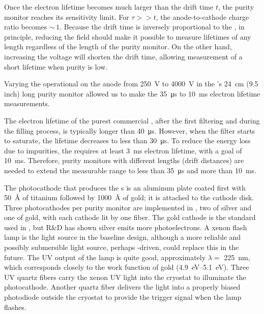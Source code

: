 Once the electron lifetime becomes much larger than the drift time $t$, the purity monitor reaches its sensitivity limit.  For $\tau >> t$, the anode-to-cathode charge ratio becomes $\sim\,1$. Because the drift time is inversely proportional to the \efield, in principle, reducing the %
field should make it possible to measure lifetimes of any length regardless of the length of the purity monitor.
On the other hand, increasing the voltage will shorten the drift time, allowing measurement of a short lifetime when purity is low. 


Varying the operational  on the anode from \SI{250}{V} to \SI{4000}{V} in the 's \SI{24}{cm} (9.5 inch) long purity monitor allowed us to make the \SI{35}{\micro\second} to \SI{10}{\milli\second} electron lifetime measurements. 

The electron lifetime of the purest commercial \lar, after the first filtering and during the filling process, is typically longer than \SI{40}{\micro\second}. However, when the filter starts to saturate, the lifetime decreases to less than \SI{30}{\micro\second}.  To %
reduce the energy loss due to impurities,  the  requires 
at least \SI{3}{\milli\second} electron lifetime, with a goal of \SI{10}{\milli\second}. 
Therefore, purity monitors with different lengths (drift distances) are needed to extend the measurable range to less than \SI{35}{\micro\second} and more than  \SI{10}{\milli\second}.


The photocathode that produces the \phel{}s is an aluminum plate coated first with \SI{50}{\angstrom} of titanium followed by \SI{1000}{\angstrom} of gold; it is attached to the cathode disk.
Three photocathodes per purity monitor are implemented in , two of silver and one of gold, with each cathode lit by one fiber. The gold cathode is the standard used in , but R\&D has shown silver emits more photoelectrons.
A xenon flash lamp is the light source in the baseline design, although %
a more reliable and possibly submersible light source, perhaps -driven, could replace this in the future. The UV output of the lamp is quite good, approximately $\lambda=$ \SI{225}{\nano\meter}, which corresponds closely to the work function of gold (\SIrange{4.9}{5.1}{\eV}). 
Three UV quartz fibers carry the xenon UV light into the cryostat to illuminate the %
photocathode.   Another quartz fiber delivers the light into a properly biased photodiode outside the cryostat to provide the trigger signal when the lamp flashes. 



